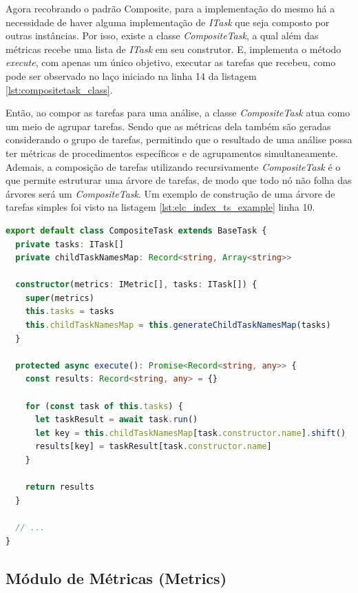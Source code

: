 \documentclass[12pt]{tcc}
\begin{document}
	Agora recobrando o padrão Composite, para a implementação do mesmo há a necessidade de haver alguma implementação de \emph{ITask} que seja composto por outras instâncias.
	Por isso, existe a classe \emph{CompositeTask}, a qual além das métricas recebe uma lista de \emph{ITask} em seu construtor.
	E, implementa o método \emph{execute}, com apenas um único objetivo, executar as tarefas que recebeu, como pode ser observado no laço iniciado na linha 14 da listagem \ref{lst:compositetask_class}.

	Então, ao compor as tarefas para uma análise, a classe \emph{CompositeTask} atua como um meio de agrupar tarefas.
	Sendo que as métricas dela também são geradas considerando o grupo de tarefas, permitindo que o resultado de uma análise possa ter métricas de procedimentos específicos e de agrupamentos simultaneamente.
	Ademais, a composição de tarefas utilizando recursivamente \emph{CompositeTask} é o que permite estruturar uma árvore de tarefas, de modo que todo nó não folha das árvores será um \emph{CompositeTask}.
	Um exemplo de construção de uma árvore de tarefas simples foi visto na listagem \ref{lst:elc_index_ts_example} linha 10.

\begin{lstlisting}[label={lst:compositetask_class}, caption={[Fragmento de código da classe \emph{CompositeTask}.]Fragmento de código da classe \emph{CompositeTask}, fundamental na implementação do padrão de projeto composite \ref{subsection:composite}.}, language=TypeScript, breaklines=true]
export default class CompositeTask extends BaseTask {
  private tasks: ITask[]
  private childTaskNamesMap: Record<string, Array<string>>

  constructor(metrics: IMetric[], tasks: ITask[]) {
    super(metrics)
    this.tasks = tasks
    this.childTaskNamesMap = this.generateChildTaskNamesMap(tasks)
  }

  protected async execute(): Promise<Record<string, any>> {
    const results: Record<string, any> = {}

    for (const task of this.tasks) {
      let taskResult = await task.run()
      let key = this.childTaskNamesMap[task.constructor.name].shift() || task.constructor.name
      results[key] = taskResult[task.constructor.name]
    }

    return results
  }

  // ...
}

\end{lstlisting}


	\subsection{Módulo de Métricas (Metrics)}
	\label{subsection:modulo-metrics}
\end{document}
